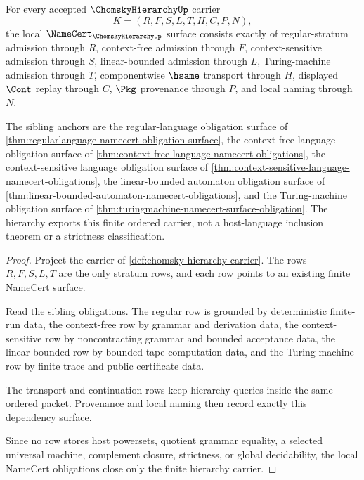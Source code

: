 \begin{theorem}
\label{thm:chomsky-hierarchy-namecert-obligations}
For every accepted $\ChomskyHierarchyUp$ carrier
$$
K=(R,F,S,L,T,H,C,P,N),
$$
the local $\NameCert_{\ChomskyHierarchyUp}$ surface consists exactly of regular-stratum admission through $R$, context-free admission through $F$, context-sensitive admission through $S$, linear-bounded admission through $L$, Turing-machine admission through $T$, componentwise $\hsame$ transport through $H$, displayed $\Cont$ replay through $C$, $\Pkg$ provenance through $P$, and local naming through $N$.

The sibling anchors are the regular-language obligation surface of \autoref{thm:regularlanguage-namecert-obligation-surface}, the context-free language obligation surface of \autoref{thm:context-free-language-namecert-obligations}, the context-sensitive language obligation surface of \autoref{thm:context-sensitive-language-namecert-obligations}, the linear-bounded automaton obligation surface of \autoref{thm:linear-bounded-automaton-namecert-obligations}, and the Turing-machine obligation surface of \autoref{thm:turingmachine-namecert-surface-obligation}. The hierarchy exports this finite ordered carrier, not a host-language inclusion theorem or a strictness classification.
\end{theorem}
\begin{proof}
Project the carrier of \autoref{def:chomsky-hierarchy-carrier}. The rows $R,F,S,L,T$ are the only stratum rows, and each row points to an existing finite NameCert surface.

Read the sibling obligations. The regular row is grounded by deterministic finite-run data, the context-free row by grammar and derivation data, the context-sensitive row by noncontracting grammar and bounded acceptance data, the linear-bounded row by bounded-tape computation data, and the Turing-machine row by finite trace and public certificate data.

The transport and continuation rows keep hierarchy queries inside the same ordered packet. Provenance and local naming then record exactly this dependency surface.

Since no row stores host powersets, quotient grammar equality, a selected universal machine, complement closure, strictness, or global decidability, the local NameCert obligations close only the finite hierarchy carrier.
\end{proof}


